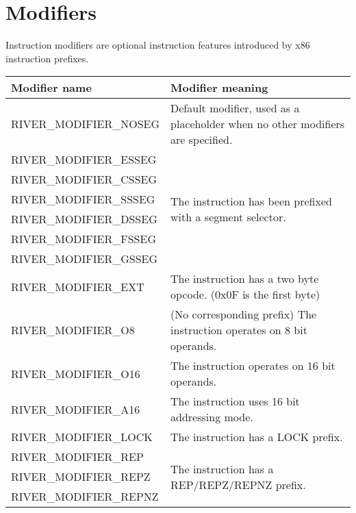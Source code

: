 \documentclass[12pt]{report}
\begin{document}
\section{Modifiers}
\label{sec:modifiers}
Instruction modifiers are optional instruction features introduced by x86 instruction prefixes.\\
\begin{tabular}[t]{| p{6cm} | p{10cm} |}
\hline
	\textbf{Modifier name} & \textbf{Modifier meaning}\\ \hline
	RIVER\_MODIFIER\_NOSEG & Default modifier, used as a placeholder when no other modifiers are specified.\\ \hline
	RIVER\_MODIFIER\_ESSEG & \multirow{6}{*}{The instruction has been prefixed with a segment selector.} \\
	RIVER\_MODIFIER\_CSSEG &\\
	RIVER\_MODIFIER\_SSSEG &\\
	RIVER\_MODIFIER\_DSSEG &\\
	RIVER\_MODIFIER\_FSSEG &\\
	RIVER\_MODIFIER\_GSSEG &\\ \hline
	RIVER\_MODIFIER\_EXT & The instruction has a two byte opcode. (0x0F is the first byte)\\ \hline
	RIVER\_MODIFIER\_O8 & (No corresponding prefix) The instruction operates on 8 bit operands.\\ \hline
	RIVER\_MODIFIER\_O16 & The instruction operates on 16 bit operands.\\ \hline
	RIVER\_MODIFIER\_A16 & The instruction uses 16 bit addressing mode.\\ \hline
	RIVER\_MODIFIER\_LOCK & The instruction has a LOCK prefix.\\ \hline
	RIVER\_MODIFIER\_REP & \multirow{3}{*}{The instruction has a REP/REPZ/REPNZ prefix.}\\
	RIVER\_MODIFIER\_REPZ &\\
	RIVER\_MODIFIER\_REPNZ &\\ \hline
\end{tabular}
\end{document}
